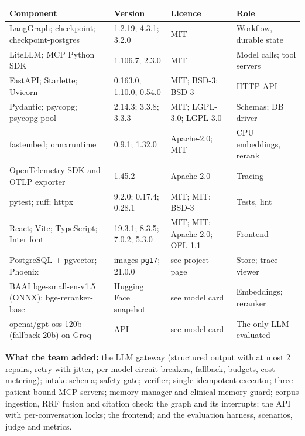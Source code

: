 \documentclass[10pt,a4paper]{article}
\begin{document}
\begin{table}[htbp]
\centering
\footnotesize
\begin{tabularx}{\textwidth}{P{4.6cm} P{3.3cm} P{3.0cm} L}
\toprule
\textbf{Component} & \textbf{Version} & \textbf{Licence} & \textbf{Role} \\
\midrule
LangGraph; checkpoint; checkpoint-postgres & 1.2.19; 4.3.1; 3.2.0 & MIT & Workflow, durable state \\
LiteLLM; MCP Python SDK~\cite{mcp} & 1.106.7; 2.3.0 & MIT & Model calls; tool servers \\
FastAPI; Starlette; Uvicorn & 0.163.0; 1.10.0; 0.54.0 & MIT; BSD-3; BSD-3 & HTTP API \\
Pydantic; psycopg; psycopg-pool & 2.14.3; 3.3.8; 3.3.3 & MIT; LGPL-3.0; LGPL-3.0 & Schemas; DB driver \\
fastembed; onnxruntime & 0.9.1; 1.32.0 & Apache-2.0; MIT & CPU embeddings, rerank \\
OpenTelemetry SDK and OTLP exporter & 1.45.2 & Apache-2.0 & Tracing \\
pytest; ruff; httpx & 9.2.0; 0.17.4; 0.28.1 & MIT; MIT; BSD-3 & Tests, lint \\
React; Vite; TypeScript; Inter font & 19.3.1; 8.3.5; 7.0.2; 5.3.0 & MIT; MIT; Apache-2.0; OFL-1.1 & Frontend \\
PostgreSQL + pgvector; Phoenix & images \texttt{pg17}; 21.0.0 & see project page~\cite{pgvector,phoenix} & Store; trace viewer \\
BAAI bge-small-en-v1.5 (ONNX); bge-reranker-base & Hugging Face snapshot & see model card~\cite{bge} & Embeddings; reranker \\
openai/gpt-oss-120b (fallback 20b) on Groq & API & see model card~\cite{gptoss} & The only LLM evaluated \\
\bottomrule
\end{tabularx}
\end{table}

\textbf{What the team added:} the LLM gateway (structured output with at most 2 repairs, retry with jitter, per-model circuit breakers, fallback, budgets, cost metering); intake schema; safety gate; verifier; single idempotent executor; three patient-bound MCP servers; memory manager and clinical memory guard; corpus ingestion, RRF fusion and citation check; the graph and its interrupts; the API with per-conversation locks; the frontend; and the evaluation harness, scenarios, judge and metrics.

\FloatBarrier
\end{document}
